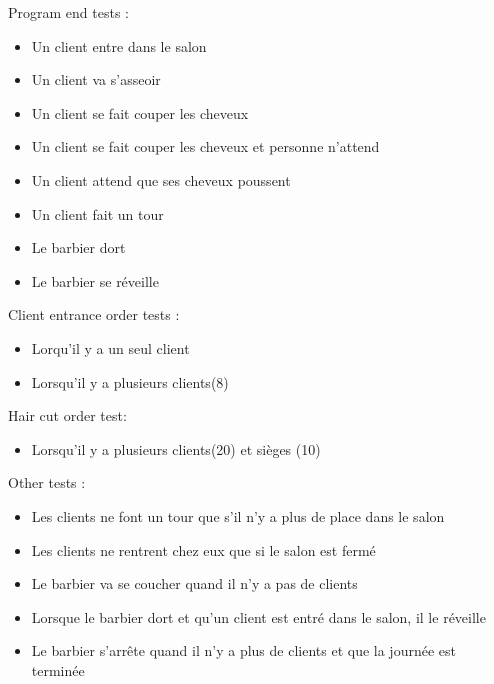 \documentclass{article}
\begin{document}
    Program end tests :
    \begin{itemize}
        \item Un client entre dans le salon
        \item Un client va s'asseoir
        \item Un client se fait couper les cheveux
        \item Un client se fait couper les cheveux et personne n'attend
        \item Un client attend que ses cheveux poussent
        \item Un client fait un tour
        \item Le barbier dort
        \item Le barbier se réveille
    \end{itemize}

    Client entrance order tests :
    \begin{itemize}
        \item Lorqu'il y a un seul client
        \item Lorsqu'il y a plusieurs clients(8)
    \end{itemize}

    Hair cut order test:
    \begin{itemize}
        \item Lorsqu'il y a plusieurs clients(20) et sièges (10)
    \end{itemize}

    Other tests :
    \begin{itemize}
        \item Les clients ne font un tour que s'il n'y a plus de place dans le salon
        \item Les clients ne rentrent chez eux que si le salon est fermé
        \item Le barbier va se coucher quand il n'y a pas de clients
        \item Lorsque le barbier dort et qu'un client est entré dans le salon, il le réveille
        \item Le barbier s'arrête quand il n'y a plus de clients et que la journée est terminée
    \end{itemize}
\end{document}
